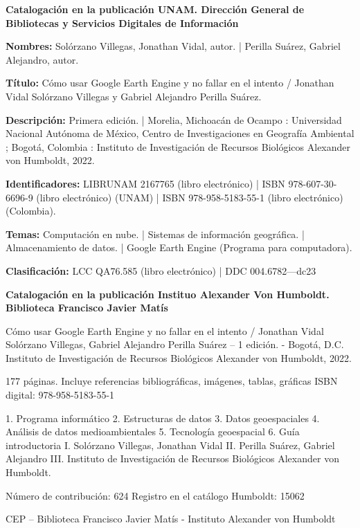 \newpage

\vspace*{\fill}
\begin{center}
    \begin{blackbox}
        {\footnotesize \textbf{Catalogación en la publicación UNAM. Dirección General de Bibliotecas y Servicios Digitales de Información}

            \textbf{Nombres:} Solórzano Villegas, Jonathan Vidal, autor. | Perilla Suárez, Gabriel Alejandro, autor.  

            \textbf{Título:} Cómo usar Google Earth Engine y no fallar en el intento / Jonathan Vidal Solórzano Villegas y Gabriel Alejandro Perilla Suárez.

            \textbf{Descripción:} Primera edición. | Morelia, Michoacán de Ocampo : Universidad Nacional Autónoma de México, Centro de Investigaciones en Geografía Ambiental ; Bogotá, Colombia : Instituto de Investigación de Recursos Biológicos Alexander von Humboldt, 2022.  
            
            \textbf{Identificadores:} LIBRUNAM 2167765 (libro electrónico) | ISBN 978-607-30-6696-9 (libro electrónico) (UNAM) | ISBN 978-958-5183-55-1 (libro electrónico) (Colombia).    
            
            \textbf{Temas:} Computación en nube. | Sistemas de información geográfica. | Almacenamiento de datos. | Google Earth Engine (Programa para computadora). 
            
            \textbf{Clasificación:} LCC QA76.585 (libro electrónico) | DDC 004.6782—dc23}
        
    \end{blackbox}

    \begin{blackbox}
        {\footnotesize \textbf{Catalogación en la publicación Instituo Alexander Von Humboldt. Biblioteca Francisco Javier Matís}

            Cómo usar Google Earth Engine y no fallar en el intento / Jonathan Vidal Solórzano Villegas, Gabriel Alejandro Perilla Suárez – 1 edición. - Bogotá, D.C. Instituto de Investigación de Recursos Biológicos Alexander von Humboldt, 2022.  
            
                177 páginas.
                Incluye referencias bibliográficas, imágenes, tablas, gráficas
                ISBN digital: 978-958-5183-55-1
            
            1. Programa informático 2. Estructuras de datos 3. Datos geoespaciales 4. Análisis de datos medioambientales 5. Tecnología geoespacial 6. Guía introductoria I. Solórzano Villegas, Jonathan Vidal II. Perilla Suárez, Gabriel Alejandro III. Instituto de Investigación de Recursos Biológicos Alexander von Humboldt. 
            
            Número de contribución: 624
            Registro en el catálogo Humboldt: 15062    
            
            CEP – Biblioteca Francisco Javier Matís - Instituto Alexander von Humboldt}
        
    \end{blackbox}
\end{center}
